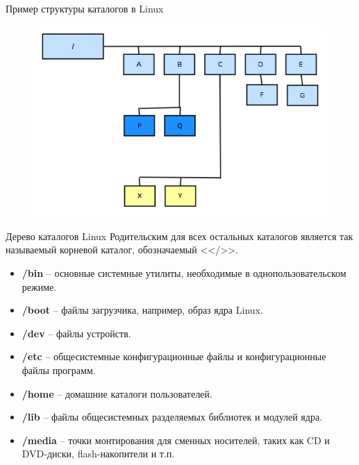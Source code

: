 \documentclass[xcolor=table]{beamer}
\begin{document}
\begin{frame}[fragile]{Пример структуры каталогов в Linux}
	\begin{figure}[h]
		\centering
		\includegraphics[scale=0.5]{images/lec09-pic02.png}
	\end{figure}
\end{frame}

\begin{frame}[fragile]{Дерево каталогов Linux}
Родительским для всех остальных каталогов является так называемый корневой каталог, обозначаемый <</>>.
	\begin{itemize}
		\item \textbf{/bin} -- основные системные утилиты, необходимые в однопользовательском режиме.
		\item \textbf{/boot} -- файлы загрузчика, например, образ ядра Linux.
		\item \textbf{/dev} -- файлы устройств.
		\item \textbf{/etc} -- общесистемные конфигурационные файлы и конфигурационные файлы программ.
		\item \textbf{/home} -- домашние каталоги пользователей. 
		\item \textbf{/lib} -- файлы общесистемных разделяемых библиотек и модулей ядра.
		\item \textbf{/media} -- точки монтирования для сменных носителей, таких как CD и DVD-диски, flash-накопители и т.п.
	\end{itemize}
\end{frame}
\end{document}
